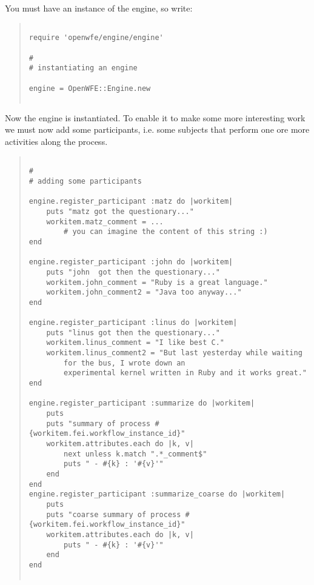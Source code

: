         You must have an instance of the engine, so write:
        
        
        \begin{quote}
        \begin{verbatim}
        
require 'openwfe/engine/engine'

#
# instantiating an engine

engine = OpenWFE::Engine.new
        
        \end{verbatim}
        \end{quote}


        Now the engine is instantiated. To enable it to make some more interesting work
        we must now add some participants, i.e. some subjects that perform one ore
        more activities along the process.
        
        \begin{quote}
        \begin{verbatim}
        
#
# adding some participants

engine.register_participant :matz do |workitem|
    puts "matz got the questionary..."
    workitem.matz_comment = ... 
        # you can imagine the content of this string :)
end

engine.register_participant :john do |workitem|
    puts "john  got then the questionary..."
    workitem.john_comment = "Ruby is a great language."
    workitem.john_comment2 = "Java too anyway..."
end

engine.register_participant :linus do |workitem|
    puts "linus got then the questionary..."
    workitem.linus_comment = "I like best C."
    workitem.linus_comment2 = "But last yesterday while waiting 
        for the bus, I wrote down an 
        experimental kernel written in Ruby and it works great."
end

engine.register_participant :summarize do |workitem|
    puts 
    puts "summary of process #{workitem.fei.workflow_instance_id}"
    workitem.attributes.each do |k, v|
        next unless k.match ".*_comment$"
        puts " - #{k} : '#{v}'"
    end
end 
engine.register_participant :summarize_coarse do |workitem|
    puts 
    puts "coarse summary of process #{workitem.fei.workflow_instance_id}"
    workitem.attributes.each do |k, v|
        puts " - #{k} : '#{v}'"
    end
end 
        
        \end{verbatim}
        \end{quote}

